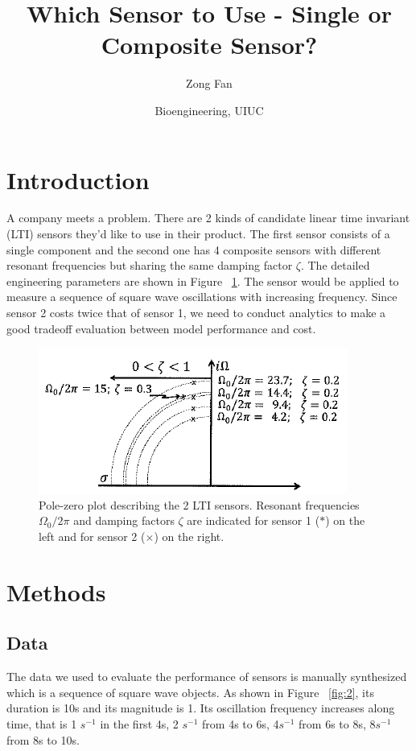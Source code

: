 \documentclass[12pt,a4paper,twocolumn]{article}
\title{\vspace{-1cm}\Large\textbf{{Which Sensor to Use - Single or Composite Sensor?}}}
\author{Zong Fan}
\date{Bioengineering, UIUC}
\begin{document}
\maketitle

\section{Introduction}
A company meets a problem. There are 2 kinds of candidate linear time invariant (LTI) sensors they'd like to use in their product. The first sensor consists of a single component and the second one has 4 composite sensors with different resonant frequencies but sharing the same damping factor $\zeta$. The detailed engineering parameters are shown in Figure ~\ref{fig:1}. The sensor would be applied to measure a sequence of square wave oscillations with increasing frequency. Since sensor 2 costs twice that of sensor 1, we need to conduct analytics to make a good tradeoff evaluation between model performance and cost. 

\begin{figure}[!ht]
    \includegraphics[width=\columnwidth]{lab2_pole.png}
    \caption{Pole-zero plot describing the 2 LTI sensors\cite{insana2020biomedical}. Resonant frequencies $\Omega_0/2\pi$ and damping factors $\zeta$ are indicated for sensor 1 ($\ast$) on the left and for sensor 2 ($\times$) on the right.}
    \label{fig:1}
\end{figure}

\section{Methods}
\subsection{Data}
The data we used to evaluate the performance of sensors is manually synthesized which is a sequence of square wave objects. As shown in Figure ~\ref{fig:2}, its duration is 10s and its magnitude is 1. Its oscillation frequency increases along time, that is 1 $s^{-1}$ in the first 4s, 2 $s^{-1}$ from 4s to 6s, 4$s^{-1}$ from 6s to 8s, 8$s^{-1}$ from 8s to 10s. 
\end{document}
